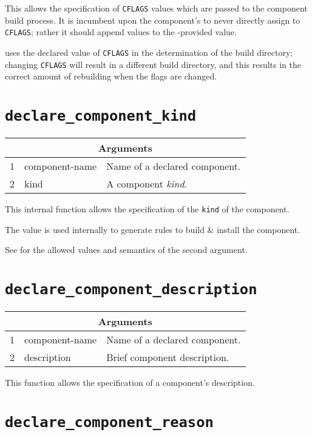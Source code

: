 This allows the specification of \texttt{CFLAGS} values which are
passed to the component build process.  It is incumbent upon the
component's \makefile to never directly assign to \texttt{CFLAGS};
rather it should append values to the \lmsbw-provided value.

\lmsbw uses the declared value of \texttt{CFLAGS} in the determination
of the build directory; changing \texttt{CFLAGS} will result in a
different build directory, and this results in the correct amount of
rebuilding when the flags are changed.

\section{\texttt{declare\_component\_kind}}\label{api:kind}

\begin{tabularx}{\linewidth}{ll|X}
  \multicolumn{3}{c}{\textbf{Arguments}} \\ \hline

  1 & component-name & Name of a declared component. \\
  2 & kind & A component \emph{kind}.
\end{tabularx}

This internal function allows the specification of the \texttt{kind}
of the component.

The value is used internally to generate \make rules to build \&
install the component.

See  for the allowed values and semantics of the
second argument.


\section{\texttt{declare\_component\_description}}\label{api:description}

\begin{tabularx}{\linewidth}{ll|X}
  \multicolumn{3}{c}{\textbf{Arguments}} \\ \hline

  1 & component-name & Name of a declared component. \\
  2 & description & Brief component description.
\end{tabularx}

This function allows the specification of a component's description.

\section{\texttt{declare\_component\_reason}}\label{api:reason}

